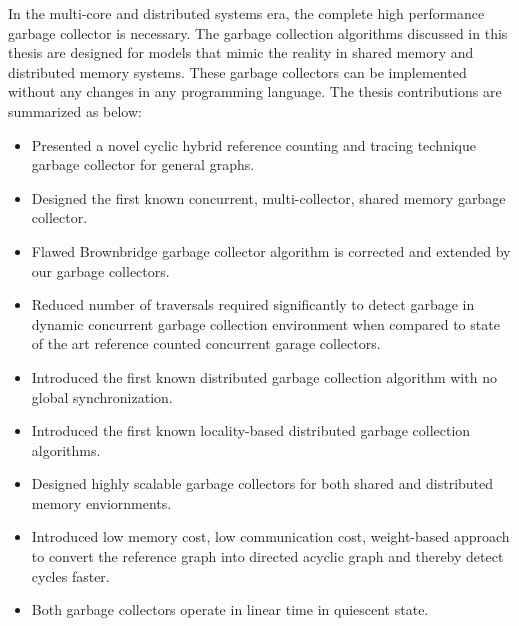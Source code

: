 In the multi-core and distributed systems era, the complete high performance garbage collector is necessary. The garbage collection algorithms discussed in this thesis are designed for models that mimic the reality in shared memory and distributed memory systems. These garbage collectors  can be implemented without any changes in any programming language. The thesis contributions are summarized as below:
\begin{itemize}
		\item Presented a novel cyclic hybrid reference counting and tracing technique garbage collector for general graphs.
		\item Designed the first known concurrent, multi-collector, shared memory garbage collector.
		\item Flawed Brownbridge garbage collector algorithm is corrected and extended by our garbage collectors.
		\item Reduced number of traversals required significantly to detect garbage in dynamic concurrent garbage collection environment when compared to state of the art reference counted concurrent garage collectors.
		\item Introduced the first known distributed garbage collection algorithm with no global synchronization.
		\item Introduced the first known locality-based distributed garbage collection algorithms.
		\item Designed highly scalable garbage collectors for both shared and distributed memory enviornments.
		\item Introduced low memory cost, low communication cost, weight-based approach to convert the reference graph into directed acyclic graph and thereby detect cycles faster.
		\item Both garbage collectors operate in linear time in quiescent state.
\end{itemize}